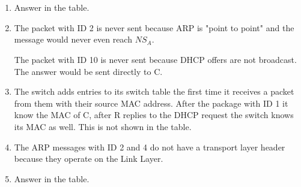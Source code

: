 \documentclass[12pt, a4paper]{article}
\begin{document}
\section{} %
\begin{enumerate}
	\item %
	Answer in the table.

	\item %
	The packet with ID 2 is never sent because ARP is "point to point" and the message would never even reach $NS_A$.

	The packet with ID 10 is never sent because DHCP offers are not broadcast. The answer would be sent directly to C.

	\item %
	The switch adds entries to its switch table the first time it receives a packet from them with their source MAC address. After the package with ID 1 it know the MAC of C, after R replies to the DHCP request the switch knows its MAC as well. This is not shown in the table.

	\item %
	The ARP messages with ID 2 and 4 do not have a transport layer header because they operate on the Link Layer.

	\item %
	Answer in the table.
\end{enumerate}
\end{document}
